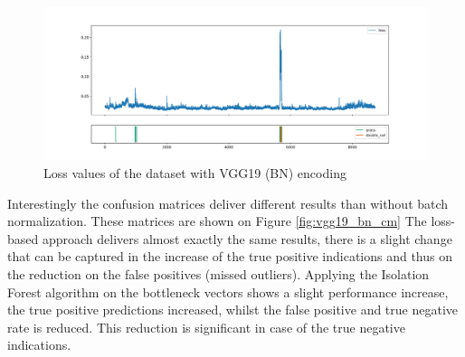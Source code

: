 \begin{figure}[H]
    \centering
    \includegraphics[width=\textwidth,trim={0 1cm 0 1cm},clip]{./results/vgg19_bn_vgg19/20230525_045131_feature_vectors_loss.png}
    \caption{Loss values of the dataset with VGG19 (BN) encoding}
    \label{fig:vgg19_bn_loss}
\end{figure}

Interestingly the confusion matrices deliver different results than without batch normalization.
These matrices are shown on Figure \ref{fig:vgg19_bn_cm}
The loss-based approach delivers almost exactly the same results, there is a slight change that can be
captured in the increase of the true positive indications and thus on the reduction
on the false positives (missed outliers).
Applying the Isolation Forest algorithm on the bottleneck vectors shows a slight performance increase,
the true positive predictions increased, whilst the false positive and true negative rate is reduced.
This reduction is significant in case of the true negative indications.

